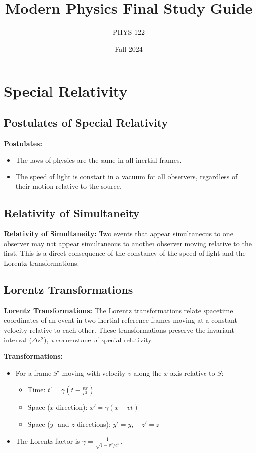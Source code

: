 \documentclass{article}
\title{Modern Physics Final Study Guide}
\author{PHYS-122}
\date{Fall 2024}
\newcommand{\eqbox}[1]{\begin{tcolorbox}[colback=gray!10] #1 \end{tcolorbox}}
\newcommand{\conceptbox}[1]{\begin{tcolorbox}[colback=blue!10] #1 \end{tcolorbox}}
\begin{document}
\maketitle

\newpage

\tableofcontents

\newpage

\section{Special Relativity}

\subsection{Postulates of Special Relativity}
\conceptbox{
\textbf{Postulates:}
\begin{itemize}
    \item The laws of physics are the same in all inertial frames.
    \item The speed of light is constant in a vacuum for all observers, regardless of their motion relative to the source.
\end{itemize}
}

\subsection{Relativity of Simultaneity}
\conceptbox{
\textbf{Relativity of Simultaneity:}
Two events that appear simultaneous to one observer may not appear simultaneous to another observer moving relative to the first. This is a direct consequence of the constancy of the speed of light and the Lorentz transformations.
}

\subsection{Lorentz Transformations}

\conceptbox{
\textbf{Lorentz Transformations:}
The Lorentz transformations relate spacetime coordinates of an event in two inertial reference frames moving at a constant velocity relative to each other. These transformations preserve the invariant interval (\( \Delta s^2 \)), a cornerstone of special relativity.
}

\conceptbox{
\textbf{Transformations:}
\begin{itemize}
    \item For a frame \( S' \) moving with velocity \( v \) along the \( x \)-axis relative to \( S \):
    \eqbox{
    \begin{itemize}
        \item Time: \( t' = \gamma \left( t - \frac{vx}{c^2} \right) \)
        \item Space (\( x \)-direction): \( x' = \gamma \left( x - vt \right) \)
        \item Space (\( y \)- and \( z \)-directions): \( y' = y, \quad z' = z \)
    \end{itemize}
    }
    \item The Lorentz factor is \( \gamma = \frac{1}{\sqrt{1 - v^2/c^2}} \).
\end{itemize}
}
\end{document}
